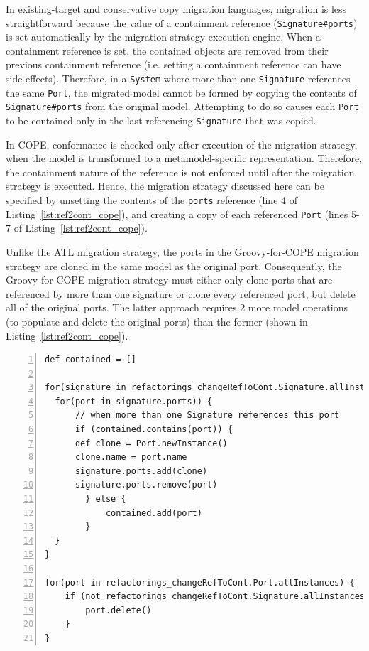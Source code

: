 In existing-target and conservative copy migration languages, migration is less straightforward because the value of a containment reference (\texttt{Signature\#ports}) is set automatically by the migration strategy execution engine. When a containment reference is set, the contained objects are removed from their previous containment reference (i.e. setting a containment reference can have side-effects). Therefore, in a \texttt{System} where more than one \texttt{Signature} references the same \texttt{Port}, the migrated model cannot be formed by copying the contents of \texttt{Signature\#ports} from the original model. Attempting to do so causes each \texttt{Port} to be contained only in the last referencing \texttt{Signature} that was copied.

In COPE, conformance is checked only after execution of the migration strategy, when the model is transformed to a metamodel-specific representation. Therefore, the containment nature of the reference is not enforced until after the migration strategy is executed. Hence, the migration strategy discussed here can be specified by unsetting the contents of the \texttt{ports} reference (line 4 of Listing~\ref{lst:ref2cont_cope}), and creating a copy of each referenced \texttt{Port} (lines 5-7 of Listing~\ref{lst:ref2cont_cope}).

Unlike the ATL migration strategy, the ports in the Groovy-for-COPE migration strategy are cloned in the same model as the original port. Consequently, the Groovy-for-COPE migration strategy must either only clone ports that are referenced by more than one signature or clone every referenced port, but delete all of the original ports. The latter approach requires 2 more model operations (to populate and delete the original ports) than the former (shown in Listing~\ref{lst:ref2cont_cope}).

\begin{lstlisting}[basicstyle=\ttfamily\footnotesize, flexiblecolumns=true, numbers=left, nolol=true, caption=Change R to C model migration in COPE, label=lst:ref2cont_cope, language=COPE, tabsize=2]
def contained = []

for(signature in refactorings_changeRefToCont.Signature.allInstances) {
  for(port in signature.ports)) {
	  // when more than one Signature references this port
	  if (contained.contains(port)) {
      def clone = Port.newInstance()
      clone.name = port.name
      signature.ports.add(clone)
      signature.ports.remove(port)
		} else {
			contained.add(port)
		}
  }
}

for(port in refactorings_changeRefToCont.Port.allInstances) {
	if (not refactorings_changeRefToCont.Signature.allInstances.any { it.ports.contains(port) }) {
	  	port.delete()
	}
}
\end{lstlisting}

